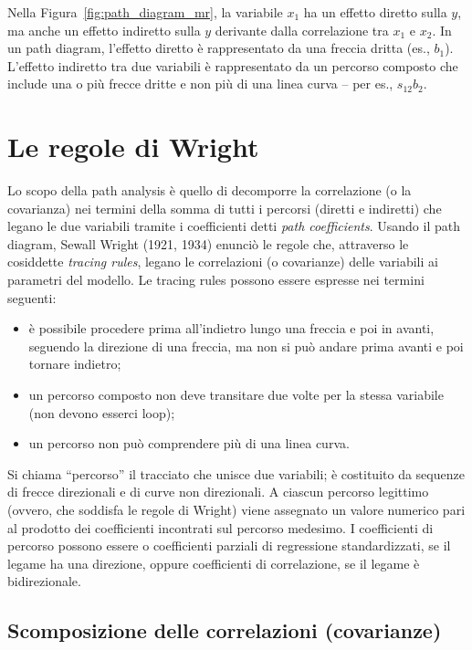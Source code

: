 Nella Figura~\ref{fig:path_diagram_mr}, la variabile $x_1$ ha un effetto diretto sulla $y$, ma anche un effetto indiretto sulla $y$ derivante dalla correlazione tra $x_1$ e $x_2$. 
In un path diagram, l'effetto diretto è rappresentato da una freccia dritta (es., $b_{1}$).
L'effetto indiretto tra due variabili è rappresentato da un percorso composto
che include una o più frecce dritte e non più di una linea curva --
per es., $s_{12} b_{2}$.

\section{Le regole di Wright}

Lo scopo della path analysis è quello di decomporre la correlazione (o la
covarianza) nei termini della somma di tutti i percorsi (diretti e
indiretti) che legano le due variabili tramite i coefficienti detti
\emph{path coefficients}.
Usando il path diagram, Sewall Wright (1921, 1934)
enunciò le regole che, attraverso le cosiddette \emph{tracing rules},
legano le correlazioni (o covarianze) delle variabili ai parametri del
modello. Le tracing rules possono essere espresse nei termini
seguenti:
\begin{itemize}
\item è possibile procedere prima all'indietro lungo una freccia e poi in avanti, seguendo la direzione di una freccia, ma non si può andare prima avanti e poi tornare indietro;
\item un percorso composto non deve transitare due volte per la stessa
  variabile (non devono esserci loop);
\item un percorso non può comprendere più di una linea curva.
\end{itemize}

Si chiama ``percorso'' il tracciato che unisce due variabili;  è costituito da sequenze di frecce
direzionali e di curve non direzionali. A ciascun percorso legittimo (ovvero, che soddisfa le regole di Wright)
viene assegnato un valore numerico pari al prodotto dei
  coefficienti incontrati sul percorso medesimo.   
I coefficienti di percorso possono essere o coefficienti
  parziali di regressione standardizzati, se il legame ha una
  direzione, oppure coefficienti di correlazione, se il legame è
  bidirezionale.

\subsection{Scomposizione delle correlazioni (covarianze)}

